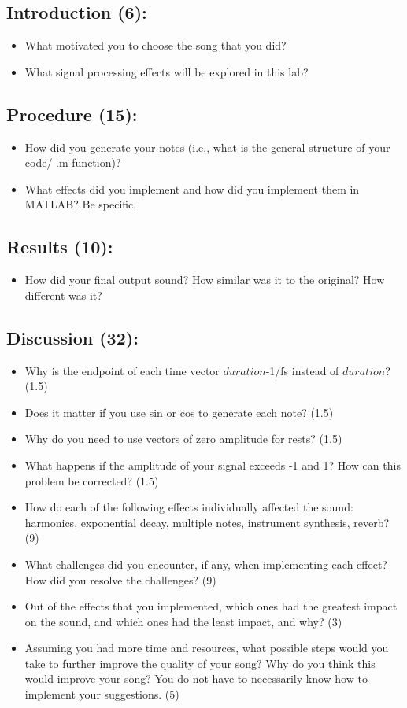 \documentclass[12pt]{article}
\begin{document}
\subsection{Introduction (6):}
\begin{itemize}[nosep]
\item What motivated you to choose the song that you did? 
\item What signal processing effects will be explored in this lab? 
\end{itemize}
 
\subsection{Procedure (15): }
\begin{itemize}[nosep]
\item How did you generate your notes (i.e., what is the general structure of your code/ .m function)?  
\item What effects did you implement and how did you implement them in MATLAB? Be specific. 
\end{itemize}
 
\subsection{Results (10): }
\begin{itemize}[nosep]
\item How did your final output sound?  How similar was it to the original?  How different was it? 
\end{itemize}
 
\subsection{Discussion (32): }
\begin{itemize}[nosep]
\item Why is the endpoint of each time vector $duration$-1/fs instead of $duration$? (1.5)
\item Does it matter if you use sin or cos to generate each note? (1.5)
\item Why do you need to use vectors of zero amplitude for rests? (1.5)
\item What happens if the amplitude of your signal exceeds -1 and 1? How can this problem be corrected? (1.5)
\item How do each of the following effects individually affected the sound: harmonics, exponential decay, multiple notes, instrument synthesis, reverb? (9)
\item What challenges did you encounter, if any, when implementing each effect? How did you resolve the challenges? (9) 
\item Out of the effects that you implemented, which ones had the greatest impact on the sound, and which ones had the least impact, and why? (3) 
\item Assuming you had more time and resources, what possible steps would you take to further improve the quality of your song?  Why do you think this would improve your song? You do not have to necessarily know how to implement your suggestions. (5) 
\end{itemize}
\end{document}

